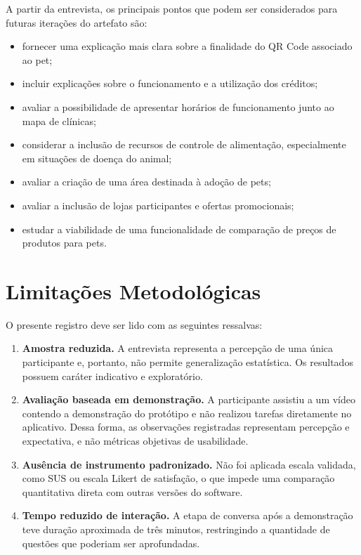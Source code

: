 \documentclass[12pt,a4paper]{article}
\begin{document}
A partir da entrevista, os principais pontos que podem ser considerados para futuras
iterações do artefato são:

\begin{itemize}[leftmargin=*]
  \item fornecer uma explicação mais clara sobre a finalidade do QR Code associado ao pet;
  \item incluir explicações sobre o funcionamento e a utilização dos créditos;
  \item avaliar a possibilidade de apresentar horários de funcionamento junto ao mapa de
        clínicas;
  \item considerar a inclusão de recursos de controle de alimentação, especialmente em
        situações de doença do animal;
  \item avaliar a criação de uma área destinada à adoção de pets;
  \item avaliar a inclusão de lojas participantes e ofertas promocionais;
  \item estudar a viabilidade de uma funcionalidade de comparação de preços de produtos
        para pets.
\end{itemize}

\section{Limitações Metodológicas}

O presente registro deve ser lido com as seguintes ressalvas:

\begin{enumerate}[leftmargin=*]
  \item \textbf{Amostra reduzida.} A entrevista representa a percepção de uma única
        participante e, portanto, não permite generalização estatística. Os resultados
        possuem caráter indicativo e exploratório.

  \item \textbf{Avaliação baseada em demonstração.} A participante assistiu a um vídeo
        contendo a demonstração do protótipo e não realizou tarefas diretamente no
        aplicativo. Dessa forma, as observações registradas representam percepção e
        expectativa, e não métricas objetivas de usabilidade.

  \item \textbf{Ausência de instrumento padronizado.} Não foi aplicada escala validada,
        como SUS ou escala Likert de satisfação, o que impede uma comparação quantitativa
        direta com outras versões do software.

  \item \textbf{Tempo reduzido de interação.} A etapa de conversa após a demonstração
        teve duração aproximada de três minutos, restringindo a quantidade de questões
        que poderiam ser aprofundadas.
\end{enumerate}
\end{document}
